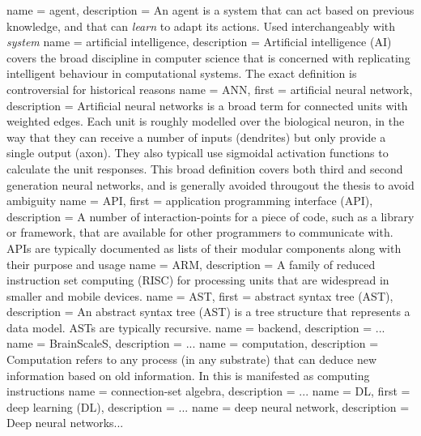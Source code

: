  {
  name = agent,
  description = {An agent is a system that can act based on previous knowledge,
		 and that can \textit{learn} to adapt its actions.
	         Used interchangeably with \textit{system}}
}
 {
    name = artificial intelligence,
    description = {Artificial intelligence (AI) covers the broad discipline in computer science
that is concerned with replicating intelligent behaviour in computational systems. The exact
definition is controversial for historical reasons \autocite{Nilsson2009}}
}
 {
  name = ANN,
  first = {artificial neural network},
  description = {
    Artificial neural networks is a broad term for connected units with 
    weighted edges.
    Each unit is roughly modelled over the biological neuron, in the way 
    that they can receive a number of inputs (dendrites) 
    but only provide a single output (axon).
    They also typicall use sigmoidal activation functions to calculate the 
    unit responses.
    This broad definition covers both third and second generation neural
    networks, and is generally avoided througout the thesis to avoid 
    ambiguity}
}
 {
  name = API,
  first = {application programming interface (API)},
  description = {A number of interaction-points for a piece of code,
		 such as a library or framework, that are available for
		 other programmers to communicate with. APIs are typically
		 documented as lists of their modular components along
		 with their purpose and usage}
}
 {
  name = {ARM},
  description = {A family of reduced instruction set computing (RISC) for 
                 processing units that are widespread in smaller and mobile
		 devices.}
}
 {
  name = {AST},
  first = {abstract syntax tree (AST)},
  description = {An abstract syntax tree (AST) is a tree structure that 
                 represents a data model. ASTs are typically recursive.}
}
 {
  name = backend,
  description = {...}
}
 {
  name = BrainScaleS,
  description = {...}
}
 {
   name = computation,
   description = {Computation refers to any process (in any
substrate) that can deduce new information based on old information. In
this is manifested as computing instructions}
}
 {
  name = {connection-set algebra},
  description = {...}
}
 {
  name = {DL},
  first = {deep learning (DL)},
  description = {...}
}
 {
  name = {deep neural network},
  description = {Deep neural networks...}
}
